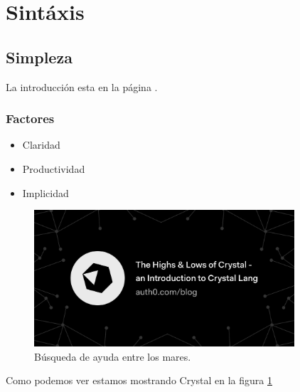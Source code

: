 \documentclass{article}
\begin{document}
\section{Sintáxis}\label{sec:syntax}
\lipsum[1]
\lipsum[1]

\subsection{Simpleza}
\lipsum[1]
La introducción esta en la página \pageref{sec:intro}.
\subsubsection{Factores}
\begin{itemize}
	\item Claridad
	\item Productividad
	\item Implicidad
\end{itemize}
\begin{figure}[H]
	\centering
	\includegraphics[height=2in]{factores.jpg}
	\caption[Búsqueda de ayuda]{Búsqueda de ayuda entre los mares.}
	\label{fig:features}
\end{figure}

Como podemos ver estamos mostrando Crystal en la figura \ref{fig:features}
\end{document}
